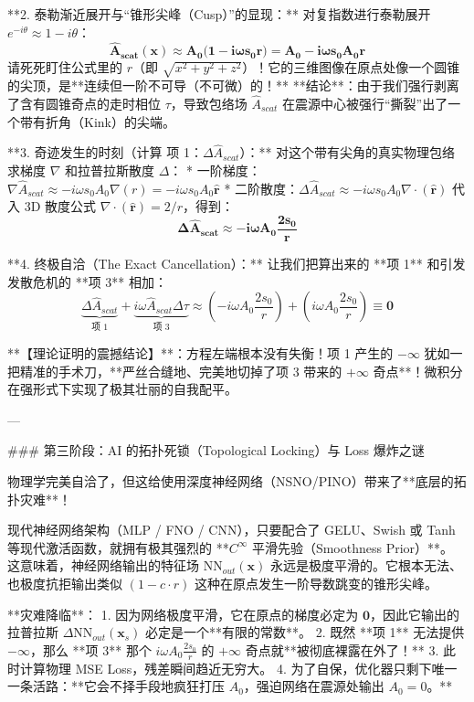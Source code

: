 \documentclass[12pt]{article}
\begin{document}
{**2. 泰勒渐近展开与“锥形尖峰（Cusp）”的显现：**
对复指数进行泰勒展开 $e^{-i\theta} \approx 1 - i\theta$：
$$ \mathbf{\hat{A}_{scat}(\mathbf{x}) \approx A_0 \big(1 - i \omega s_0 r\big) = A_0 - i \omega s_0 A_0 r} $$
请死死盯住公式里的 $r$（即 $\sqrt{x^2+y^2+z^2}$）！它的三维图像在原点处像一个圆锥的尖顶，是**连续但一阶不可导（不可微）的！**
**结论**：由于我们强行剥离了含有圆锥奇点的走时相位 $\tau$，导致包络场 $\hat{A}_{scat}$ 在震源中心被强行“撕裂”出了一个带有折角（Kink）的尖端。

**3. 奇迹发生的时刻（计算 项 1：$\Delta \hat{A}_{scat}$）：**
对这个带有尖角的真实物理包络求梯度 $\nabla$ 和拉普拉斯散度 $\Delta$：
*   一阶梯度：$\nabla \hat{A}_{scat} \approx - i \omega s_0 A_0 \nabla(r) = - i \omega s_0 A_0 \hat{\mathbf{r}}$
*   二阶散度：$\Delta \hat{A}_{scat} \approx - i \omega s_0 A_0 \nabla \cdot (\hat{\mathbf{r}})$
    代入 3D 散度公式 $\nabla \cdot (\hat{\mathbf{r}}) = 2/r$，得到：
    $$ \mathbf{\Delta \hat{A}_{scat} \approx - i \omega A_0 \frac{2 s_0}{r}} $$

**4. 终极自洽（The Exact Cancellation）：**
让我们把算出来的 **项 1** 和引发发散危机的 **项 3** 相加：
$$ \underbrace{\Delta \hat{A}_{scat}}_{\text{项 1}} + \underbrace{i \omega \hat{A}_{scat} \Delta \tau}_{\text{项 3}} \approx \left( - i \omega A_0 \frac{2 s_0}{r} \right) + \left( i \omega A_0 \frac{2 s_0}{r} \right) \equiv \mathbf{0} $$

**【理论证明的震撼结论】**：方程左端根本没有失衡！项 1 产生的 $-\infty$ 犹如一把精准的手术刀，**严丝合缝地、完美地切掉了项 3 带来的 $+\infty$ 奇点**！微积分在强形式下实现了极其壮丽的自我配平。

---

### 第三阶段：AI 的拓扑死锁（Topological Locking）与 Loss 爆炸之谜

物理学完美自洽了，但这给使用深度神经网络（NSNO/PINO）带来了**底层的拓扑灾难**！

现代神经网络架构（MLP / FNO / CNN），只要配合了 GELU、Swish 或 Tanh 等现代激活函数，就拥有极其强烈的 **$C^\infty$ 平滑先验（Smoothness Prior）**。
这意味着，神经网络输出的特征场 $\text{NN}_{out}(\mathbf{x})$ 永远是极度平滑的。它根本无法、也极度抗拒输出类似 $(1 - c \cdot r)$ 这种在原点发生一阶导数跳变的锥形尖峰。

**灾难降临**：
1. 因为网络极度平滑，它在原点的梯度必定为 $\mathbf{0}$，因此它输出的拉普拉斯 $\Delta \text{NN}_{out}(\mathbf{x}_s)$ 必定是一个**有限的常数**。
2. 既然 **项 1** 无法提供 $-\infty$，那么 **项 3** 那个 $i \omega A_0 \frac{2 s_0}{r}$ 的 $+\infty$ 奇点就**被彻底裸露在外了！**
3. 此时计算物理 MSE Loss，残差瞬间趋近无穷大。
4. 为了自保，优化器只剩下唯一一条活路：**它会不择手段地疯狂打压 $A_0$，强迫网络在震源处输出 $A_0 = 0$。**
   
}
\end{document}
